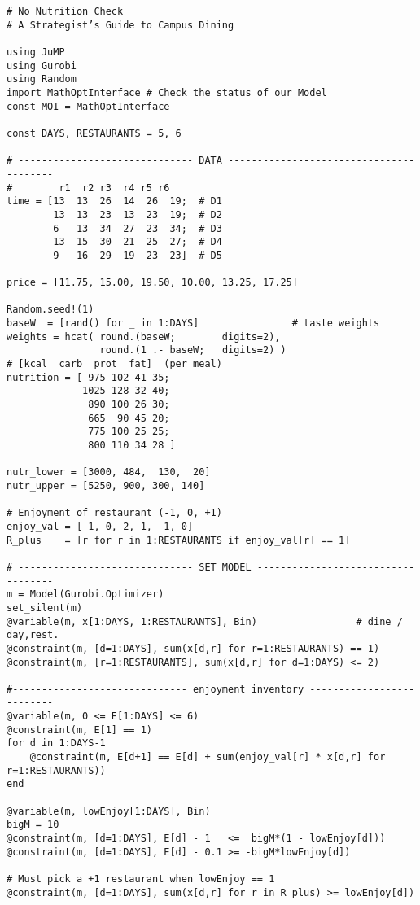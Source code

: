 \fontsize{10}{10}\selectfont
\begin{verbatim}
# No Nutrition Check
# A Strategist’s Guide to Campus Dining

using JuMP
using Gurobi
using Random
import MathOptInterface # Check the status of our Model
const MOI = MathOptInterface

const DAYS, RESTAURANTS = 5, 6

# ------------------------------ DATA ----------------------------------------
#        r1  r2 r3  r4 r5 r6
time = [13  13  26  14  26  19;  # D1
        13  13  23  13  23  19;  # D2
        6   13  34  27  23  34;  # D3  
        13  15  30  21  25  27;  # D4
        9   16  29  19  23  23]  # D5  

price = [11.75, 15.00, 19.50, 10.00, 13.25, 17.25]

Random.seed!(1)
baseW  = [rand() for _ in 1:DAYS]                # taste weights
weights = hcat( round.(baseW;        digits=2),
                round.(1 .- baseW;   digits=2) )
# [kcal  carb  prot  fat]  (per meal)
nutrition = [ 975 102 41 35;
             1025 128 32 40;
              890 100 26 30;
              665  90 45 20;
              775 100 25 25;
              800 110 34 28 ]

nutr_lower = [3000, 484,  130,  20]        
nutr_upper = [5250, 900, 300, 140]  

# Enjoyment of restaurant (‑1, 0, +1)
enjoy_val = [-1, 0, 2, 1, -1, 0]
R_plus    = [r for r in 1:RESTAURANTS if enjoy_val[r] == 1]

# ------------------------------ SET MODEL ----------------------------------- 
m = Model(Gurobi.Optimizer)
set_silent(m)
@variable(m, x[1:DAYS, 1:RESTAURANTS], Bin)                 # dine / day,rest.
@constraint(m, [d=1:DAYS], sum(x[d,r] for r=1:RESTAURANTS) == 1)
@constraint(m, [r=1:RESTAURANTS], sum(x[d,r] for d=1:DAYS) <= 2)

#------------------------------ enjoyment inventory --------------------------
@variable(m, 0 <= E[1:DAYS] <= 6)
@constraint(m, E[1] == 1)
for d in 1:DAYS-1
    @constraint(m, E[d+1] == E[d] + sum(enjoy_val[r] * x[d,r] for r=1:RESTAURANTS))
end

@variable(m, lowEnjoy[1:DAYS], Bin)
bigM = 10
@constraint(m, [d=1:DAYS], E[d] - 1   <=  bigM*(1 - lowEnjoy[d]))
@constraint(m, [d=1:DAYS], E[d] - 0.1 >= -bigM*lowEnjoy[d])

# Must pick a +1 restaurant when lowEnjoy == 1
@constraint(m, [d=1:DAYS], sum(x[d,r] for r in R_plus) >= lowEnjoy[d])


\end{verbatim}
